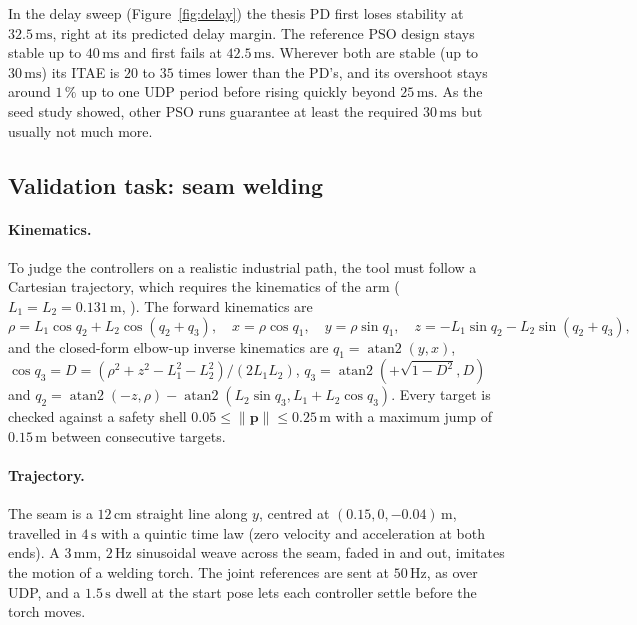 \documentclass[11pt,a4paper]{article}
\begin{document}
In the delay sweep (Figure~\ref{fig:delay}) the thesis PD first loses stability at $32.5\,\mathrm{ms}$,
right at its predicted delay margin. The reference PSO design stays stable up to $40\,\mathrm{ms}$ and first
fails at $42.5\,\mathrm{ms}$. Wherever both are stable (up to $30\,\mathrm{ms}$) its ITAE is $20$ to $35$
times lower than the PD's, and its overshoot stays around $1\,\%$ up to one UDP period before rising quickly
beyond $25\,\mathrm{ms}$. As the seed study showed, other PSO runs guarantee at least the required
$30\,\mathrm{ms}$ but usually not much more.

\subsection{Validation task: seam welding}

\paragraph{Kinematics.} To judge the controllers on a realistic industrial path, the tool must follow a
Cartesian trajectory, which requires the kinematics of the arm ($L_1 = L_2 = 0.131\,\mathrm{m}$,
). The forward kinematics are
\begin{equation}
\rho = L_1\cos q_2 + L_2\cos(q_2 + q_3),\quad x = \rho\cos q_1,\quad y = \rho\sin q_1,\quad
z = -L_1\sin q_2 - L_2\sin(q_2 + q_3),
\end{equation}
and the closed-form elbow-up inverse kinematics are $q_1 = \operatorname{atan2}(y, x)$,
$\cos q_3 = D = (\rho^2 + z^2 - L_1^2 - L_2^2)/(2L_1L_2)$, $q_3 = \operatorname{atan2}(+\sqrt{1-D^2}, D)$ and
$q_2 = \operatorname{atan2}(-z, \rho) - \operatorname{atan2}(L_2\sin q_3, L_1 + L_2\cos q_3)$. Every target is
checked against a safety shell $0.05 \le \|\bm p\| \le 0.25\,\mathrm{m}$ with a maximum jump of
$0.15\,\mathrm{m}$ between consecutive targets.

\paragraph{Trajectory.} The seam is a $12\,\mathrm{cm}$ straight line along $y$, centred at
$(0.15, 0, -0.04)\,\mathrm{m}$, travelled in $4\,\mathrm{s}$ with a quintic time law (zero velocity and
acceleration at both ends). A $3\,\mathrm{mm}$, $2\,\mathrm{Hz}$ sinusoidal weave across the seam, faded in and
out, imitates the motion of a welding torch. The joint references are sent at $50\,\mathrm{Hz}$, as over UDP,
and a $1.5\,\mathrm{s}$ dwell at the start pose lets each controller settle before the torch moves.
\end{document}
